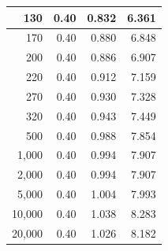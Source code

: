 \documentclass[dvipdfmx,titlepage,a4j]{jsarticle}  %
\numberwithin{equation}{section}
\begin{document}
\begin{table}[H]
\begin{center}
\begin{tabular}{r|r|r|r}
      130                                      & 0.40                                            & 0.832                                     & 6.361                                  \\ \hline
      170                                      & 0.40                                            & 0.880                                     & 6.848                                  \\ \hline
      200                                      & 0.40                                            & 0.886                                     & 6.907                                  \\ \hline
      220                                      & 0.40                                            & 0.912                                     & 7.159                                  \\ \hline
      270                                      & 0.40                                            & 0.930                                     & 7.328                                  \\ \hline
      320                                      & 0.40                                            & 0.943                                     & 7.449                                  \\ \hline
      500                                      & 0.40                                            & 0.988                                     & 7.854                                  \\ \hline
      1,000                                    & 0.40                                            & 0.994                                     & 7.907                                  \\ \hline
      2,000                                    & 0.40                                            & 0.994                                     & 7.907                                  \\ \hline
      5,000                                    & 0.40                                            & 1.004                                     & 7.993                                  \\ \hline
      10,000                                   & 0.40                                            & 1.038                                     & 8.283                                  \\ \hline
      20,000                                   & 0.40                                            & 1.026                                     & 8.182                                  \\ \hline

\end{tabular}
\end{center}
\end{table}
\end{document}
